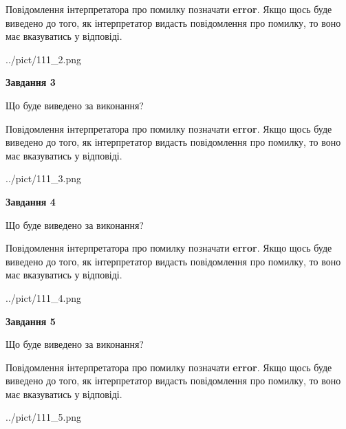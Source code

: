 \documentclass[12pt, ukrainian]{article}
\begin{document}
{\begin {large}
Повідомлення інтерпретатора про помилку позначати \textbf{error}.
Якщо щось буде виведено до того, як інтерпретатор видасть повідомлення про помилку, 
то воно має вказуватись у відповіді. \par


\begin{center}
	{../pict/111_2.png}
\end{center}
\newpage

{\begin {center}\textbf{Завдання 3}\end {center}}\par
Що буде виведено за виконання?

Повідомлення інтерпретатора про помилку позначати \textbf{error}.
Якщо щось буде виведено до того, як інтерпретатор видасть повідомлення про помилку, 
то воно має вказуватись у відповіді. \par


\begin{center}
	{../pict/111_3.png}
\end{center}
\newpage

{\begin {center}\textbf{Завдання 4}\end {center}}\par
Що буде виведено за виконання?

Повідомлення інтерпретатора про помилку позначати \textbf{error}.
Якщо щось буде виведено до того, як інтерпретатор видасть повідомлення про помилку, 
то воно має вказуватись у відповіді. \par


\begin{center}
	{../pict/111_4.png}
\end{center}
\newpage

{\begin {center}\textbf{Завдання 5}\end {center}}\par
Що буде виведено за виконання?

Повідомлення інтерпретатора про помилку позначати \textbf{error}.
Якщо щось буде виведено до того, як інтерпретатор видасть повідомлення про помилку, 
то воно має вказуватись у відповіді. \par


\begin{center}
	{../pict/111_5.png}
\end{center}
\newpage


\end{large}}
\end{document}
